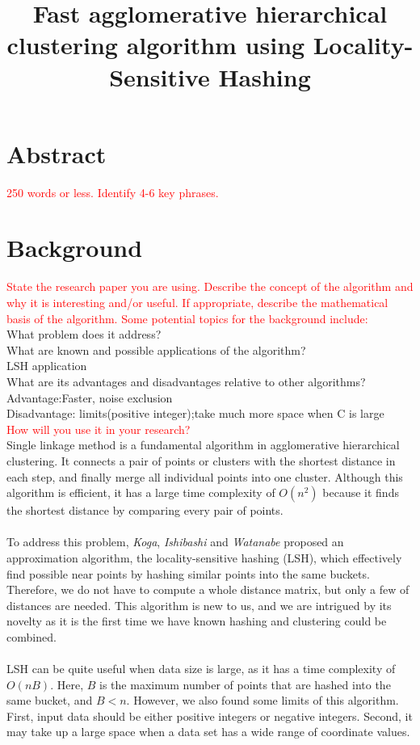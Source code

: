 \documentclass{report}
\title{Fast agglomerative hierarchical clustering algorithm using Locality-Sensitive Hashing}
\begin{document}
\maketitle
\newpage


\section*{Abstract}
\textcolor{red}{250 words or less. Identify 4-6 key phrases.}
 
\section*{Background} 
\textcolor{red}{State the research paper you are using. Describe the concept of the algorithm and why it is interesting and/or useful. If appropriate, describe the mathematical basis of the algorithm. Some potential topics for the background include:}\\
What problem does it address?\\
What are known and possible applications of the algorithm?\\
LSH application\\
What are its advantages and disadvantages relative to other algorithms?\\
Advantage:Faster, noise exclusion\\
Disadvantage: limits(positive integer);take much more space when C is large\\
\textcolor{red}{How will you use it in your research?}\\

Single linkage method is a fundamental algorithm in agglomerative hierarchical clustering. It connects a pair of points or clusters with the shortest distance in each step, and finally merge all individual points into one cluster. Although this algorithm is efficient, it has a large time complexity of $O(n^2)$ because it finds the shortest distance by comparing every pair of points. \\\\To address this problem, \textit{Koga}, \textit{Ishibashi} and \textit{Watanabe} proposed an approximation algorithm, the locality-sensitive hashing (LSH), which effectively find possible near points by hashing similar points into the same buckets. Therefore, we do not have to compute a whole distance matrix, but only a few of distances are needed. This algorithm is new to us, and we are intrigued by its novelty as it is the first time we have known hashing and clustering could be combined.\\\\
LSH can be quite useful when data size is large, as it has a time complexity of $O(nB)$. Here, $B$ is the maximum number of points that are hashed into the same bucket, and $B<n$. However, we also found some limits of this algorithm. First, input data should be either positive integers or negative integers. Second, it may take up a large space when a data set has a wide range of coordinate values. 
\end{document}
